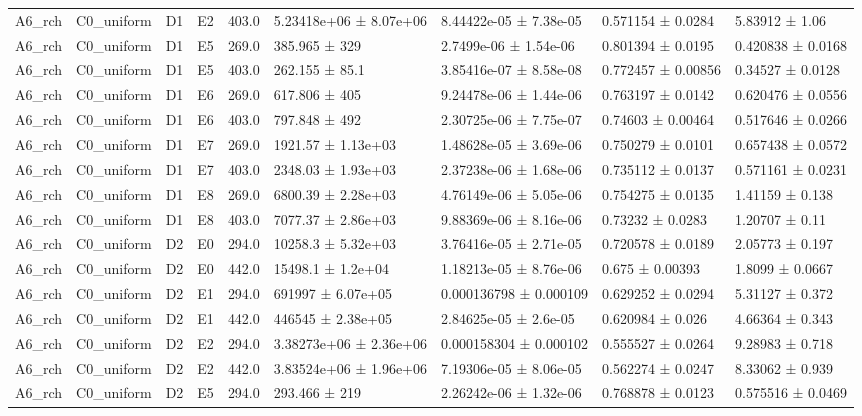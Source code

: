 \begin{table}
\begin{tabular}{lllllllll}
A6\_rch & C0\_uniform & D1 & E2 & 403.0 & 5.23418e+06 ± 8.07e+06 & 8.44422e-05 ± 7.38e-05 & 0.571154 ± 0.0284 & 5.83912 ± 1.06 \\
A6\_rch & C0\_uniform & D1 & E5 & 269.0 & 385.965 ± 329 & 2.7499e-06 ± 1.54e-06 & 0.801394 ± 0.0195 & 0.420838 ± 0.0168 \\
A6\_rch & C0\_uniform & D1 & E5 & 403.0 & 262.155 ± 85.1 & 3.85416e-07 ± 8.58e-08 & 0.772457 ± 0.00856 & 0.34527 ± 0.0128 \\
A6\_rch & C0\_uniform & D1 & E6 & 269.0 & 617.806 ± 405 & 9.24478e-06 ± 1.44e-06 & 0.763197 ± 0.0142 & 0.620476 ± 0.0556 \\
A6\_rch & C0\_uniform & D1 & E6 & 403.0 & 797.848 ± 492 & 2.30725e-06 ± 7.75e-07 & 0.74603 ± 0.00464 & 0.517646 ± 0.0266 \\
A6\_rch & C0\_uniform & D1 & E7 & 269.0 & 1921.57 ± 1.13e+03 & 1.48628e-05 ± 3.69e-06 & 0.750279 ± 0.0101 & 0.657438 ± 0.0572 \\
A6\_rch & C0\_uniform & D1 & E7 & 403.0 & 2348.03 ± 1.93e+03 & 2.37238e-06 ± 1.68e-06 & 0.735112 ± 0.0137 & 0.571161 ± 0.0231 \\
A6\_rch & C0\_uniform & D1 & E8 & 269.0 & 6800.39 ± 2.28e+03 & 4.76149e-06 ± 5.05e-06 & 0.754275 ± 0.0135 & 1.41159 ± 0.138 \\
A6\_rch & C0\_uniform & D1 & E8 & 403.0 & 7077.37 ± 2.86e+03 & 9.88369e-06 ± 8.16e-06 & 0.73232 ± 0.0283 & 1.20707 ± 0.11 \\
A6\_rch & C0\_uniform & D2 & E0 & 294.0 & 10258.3 ± 5.32e+03 & 3.76416e-05 ± 2.71e-05 & 0.720578 ± 0.0189 & 2.05773 ± 0.197 \\
A6\_rch & C0\_uniform & D2 & E0 & 442.0 & 15498.1 ± 1.2e+04 & 1.18213e-05 ± 8.76e-06 & 0.675 ± 0.00393 & 1.8099 ± 0.0667 \\
A6\_rch & C0\_uniform & D2 & E1 & 294.0 & 691997 ± 6.07e+05 & 0.000136798 ± 0.000109 & 0.629252 ± 0.0294 & 5.31127 ± 0.372 \\
A6\_rch & C0\_uniform & D2 & E1 & 442.0 & 446545 ± 2.38e+05 & 2.84625e-05 ± 2.6e-05 & 0.620984 ± 0.026 & 4.66364 ± 0.343 \\
A6\_rch & C0\_uniform & D2 & E2 & 294.0 & 3.38273e+06 ± 2.36e+06 & 0.000158304 ± 0.000102 & 0.555527 ± 0.0264 & 9.28983 ± 0.718 \\
A6\_rch & C0\_uniform & D2 & E2 & 442.0 & 3.83524e+06 ± 1.96e+06 & 7.19306e-05 ± 8.06e-05 & 0.562274 ± 0.0247 & 8.33062 ± 0.939 \\
A6\_rch & C0\_uniform & D2 & E5 & 294.0 & 293.466 ± 219 & 2.26242e-06 ± 1.32e-06 & 0.768878 ± 0.0123 & 0.575516 ± 0.0469 \\

\end{tabular}
\end{table}
